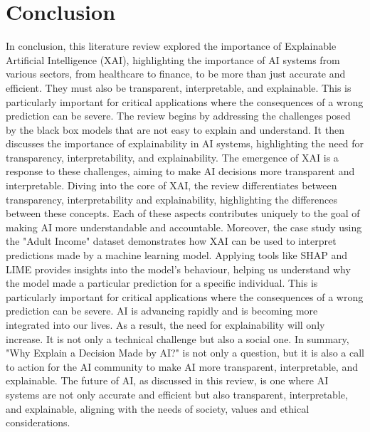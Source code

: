 \documentclass[10pt,journal,compsoc]{IEEEtran}
\begin{document}
\section{Conclusion}
In conclusion, this literature review explored the importance of Explainable Artificial Intelligence (XAI), highlighting the importance of AI systems from various sectors, from healthcare to finance, to be more than just accurate and efficient.
They must also be transparent, interpretable, and explainable. This is particularly important for critical applications where the consequences of a wrong prediction can be severe. 
The review begins by addressing the challenges posed by the black box models that are not easy to explain and understand. It then discusses the importance of explainability in AI systems, highlighting the need for transparency, interpretability, and explainability.
The emergence of XAI is a response to these challenges, aiming to make AI decisions more transparent and interpretable. Diving into the core of XAI, the review differentiates between transparency, interpretability and explainability, highlighting the differences between these concepts.
Each of these aspects contributes uniquely to the goal of making AI more understandable and accountable.
Moreover, the case study using the "Adult Income" dataset demonstrates how XAI can be used to interpret predictions made by a machine learning model. Applying tools like SHAP and LIME provides insights into the model's behaviour, helping us understand why the model made a particular prediction for a specific individual.
This is particularly important for critical applications where the consequences of a wrong prediction can be severe.
AI is advancing rapidly and is becoming more integrated into our lives. As a result, the need for explainability will only increase. 
It is not only a technical challenge but also a social one. 
In summary, "Why Explain a Decision Made by AI?" is not only a question, but it is also a call to action for the AI community to make AI more transparent, interpretable, and explainable. The future of AI, as discussed in this review, is one where AI systems are not only accurate and efficient but also transparent, interpretable, and explainable, aligning with the needs of society, values and ethical considerations.



\printbibliography
\end{document}
